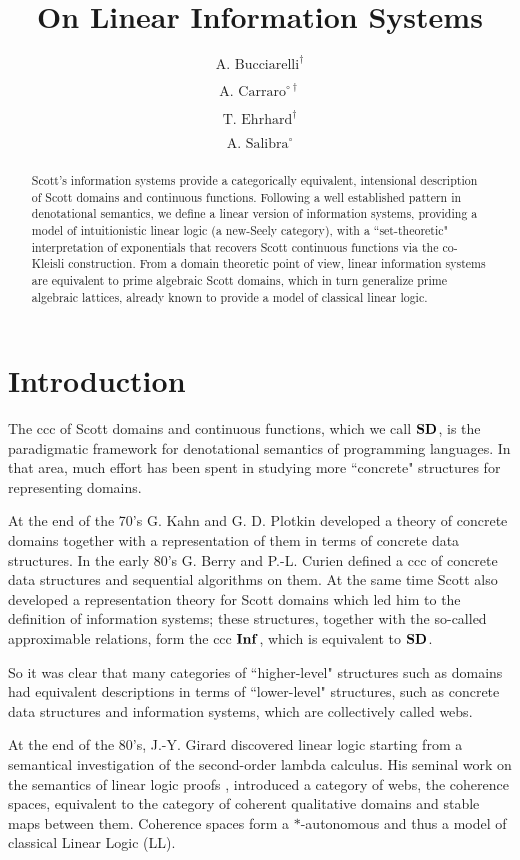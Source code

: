 \documentclass[copyright,creativecommons]{eptcs}
\title{On Linear Information Systems}
\author{
$\textrm{A.~Bucciarelli}^{\dagger}$
\institute{$\dagger$ Univerist\'{e} Paris Diderot \\ Paris, France}
\institute{Preuves Programmes et Syst\`{e}mes}
\email{Antonio.Bucciarelli@pps.jussieu.fr}
\and
$\textrm{A.~Carraro}^{\circ\dagger}$ \qquad\qquad
\institute{$\circ$ Univerist\`{a} Ca' Foscari \\ Venice, Italy}
\institute{Dipartimento di Informatica}
\email{acarraro@dsi.unive.it}
\and
$\textrm{T.~Ehrhard}^{\dagger}$ \qquad\qquad
\email{Thomas.Ehrhard@pps.jussieu.fr}
\and
$\textrm{A.~Salibra}^{\circ}$
\email{salibra@dsi.unive.it}
}
\begin{document}
\maketitle

\begin{abstract}
Scott's information systems provide a categorically equivalent, intensional description of Scott domains and continuous functions. Following a well established pattern in denotational semantics, we define a linear version of information systems, providing a model of intuitionistic linear logic (a new-Seely category), with a ``set-theoretic" interpretation of exponentials that recovers  Scott continuous functions via the co-Kleisli construction. From a domain theoretic point of view, linear information systems are equivalent to prime algebraic Scott domains, which in turn generalize prime algebraic lattices, already known to provide a model of classical linear
logic. \end{abstract}

\section{Introduction}



The ccc of Scott domains and continuous functions, which we call $\mathbf{SD}$, is the paradigmatic framework for denotational semantics of programming languages. In that area, much effort has been spent in studying more ``concrete" structures for representing domains. 

At the end of the 70's G. Kahn and G. D. Plotkin \cite{Kahn78} developed a theory of concrete domains together with a representation of them in terms of concrete data structures. In the early 80's G. Berry and P.-L. Curien \cite{Berry82} defined a ccc of concrete data structures and sequential algorithms on them. At the same time  Scott \cite{Scott82} also developed a representation theory for Scott domains which led him to the definition of information systems; these structures, together with the so-called approximable relations, form the ccc $\mathbf{Inf}$, which is equivalent to $\mathbf{SD}$.

So it was clear that many categories of ``higher-level" structures such as domains had equivalent descriptions in terms of ``lower-level" structures, such as concrete data structures and information systems, which are collectively called webs.

At the end of the 80's, J.-Y. Girard \cite{Girard86} discovered linear logic starting from a semantical investigation of the second-order lambda calculus. His seminal work on the semantics of linear logic proofs \cite{Girard87, Girard88}, introduced a category of webs, the coherence spaces, equivalent to the category of coherent qualitative domains and stable maps between them. Coherence spaces form a $\ast$-autonomous and thus a model of classical Linear Logic (LL).
\end{document}
